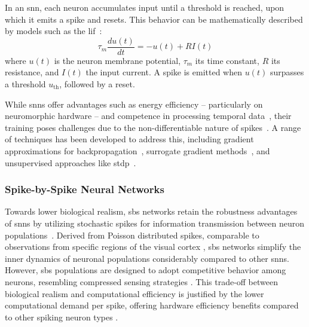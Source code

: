 In an \gls{snn}, each neuron accumulates input until a threshold is reached, upon which it emits a spike and resets. This behavior can be mathematically described by models such as the \gls{lif}~\cite{gerstner2014neuronal}:
\begin{equation}
\tau_m \frac{du(t)}{dt} = -u(t) + RI(t)
\end{equation}
where \( u(t) \) is the neuron membrane potential, \( \tau_m \) its time constant, \( R \) its resistance, and \( I(t) \) the input current. A spike is emitted when \( u(t) \) surpasses a threshold \( u_{\text{th}} \), followed by a reset.

While \glspl{snn} offer advantages such as energy efficiency -- particularly on neuromorphic hardware -- and competence in processing temporal data~\cite{merolla2014million}, their training poses challenges due to the non-differentiable nature of spikes~\cite{neftci2019surrogate}. A range of techniques has been developed to address this, including gradient approximations for backpropagation~\cite{lee2016training}, surrogate gradient methods~\cite{neftci2019surrogate}, and unsupervised approaches like \gls{stdp}~\cite{masquelier2007unsupervised}.


\subsubsection{Spike-by-Spike Neural Networks} 
\label{sec:sbs}

Towards lower biological realism, \gls{sbs} networks retain the robustness advantages of \glspl{snn} by utilizing stochastic spikes for information transmission between neuron populations~\cite{rotermund2019back, ernst2007efficient}. Derived from Poisson distributed spikes, comparable to observations from specific regions of the visual cortex \cite{shadlen1994noise, softky1993highly}, \gls{sbs} networks simplify the inner dynamics of neuronal populations considerably compared to other \glspl{snn}. However, \gls{sbs} populations are designed to adopt competitive behavior among neurons, resembling compressed sensing strategies \cite{ganguli2012compressed, ganguli2010statistical}. This trade-off between biological realism and computational efficiency is justified by the lower computational demand per spike, offering hardware efficiency benefits compared to other spiking neuron types \cite{pfeiffer2018deep}.

